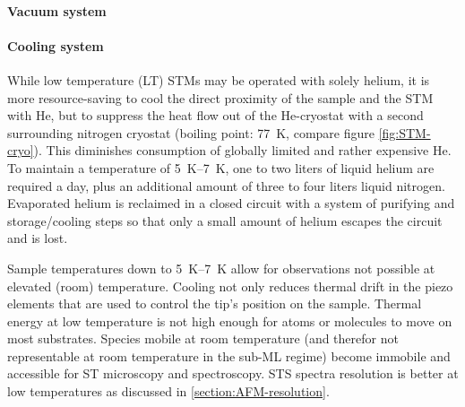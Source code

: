\paragraph{Vacuum system}
\paragraph{Cooling system} 
While low temperature (LT) STMs may be operated with solely helium, it is more resource-saving to cool the direct proximity of the sample and the STM with He, but to suppress the heat flow out of the He-cryostat with a second surrounding nitrogen cryostat (boiling point: \SI{77}{\K}, compare figure \ref{fig:STM-cryo}). This diminishes consumption of globally limited and rather expensive He. To maintain a temperature of \SIrange{5}{7}{\K}, one to two liters of liquid helium are required a day, plus an additional amount of three to four liters liquid nitrogen. Evaporated helium is reclaimed in a closed circuit with a system of purifying and storage/cooling steps so that only a small amount of helium escapes the circuit and is lost.

Sample temperatures down to \SIrange{5}{7}{\K} allow for observations not possible at elevated (room) temperature. Cooling not only reduces thermal drift in the piezo elements that are used to control the tip's position on the sample. Thermal energy at low temperature is not high enough for atoms or molecules to move on most substrates. Species mobile at room temperature (and therefor not representable at room temperature in the sub-ML regime) become immobile and accessible for ST microscopy and spectroscopy. STS spectra resolution is better at low temperatures as discussed in \ref{section:AFM-resolution}.

